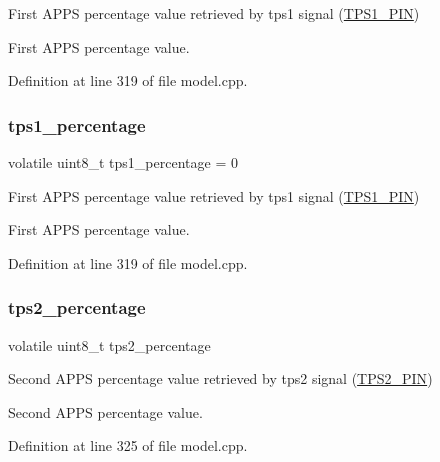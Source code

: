 First A\+P\+PS percentage value retrieved by tps1 signal (\mbox{\hyperlink{group___board__pinout__group_gae9aa914854f611488701c96a330b0bd4}{T\+P\+S1\+\_\+\+P\+IN}}) 

First A\+P\+PS percentage value. 

Definition at line 319 of file model.\+cpp.

\mbox{\label{group___board__model__group_ga1d42f28ccf027a3243fad064fa47ef81}} 
\subsubsection{\texorpdfstring{tps1\+\_\+percentage}{tps1\_percentage}\hspace{0.1cm}{\footnotesize\ttfamily [2/2]}}
{\footnotesize\ttfamily volatile uint8\+\_\+t tps1\+\_\+percentage = 0}



First A\+P\+PS percentage value retrieved by tps1 signal (\mbox{\hyperlink{group___board__pinout__group_gae9aa914854f611488701c96a330b0bd4}{T\+P\+S1\+\_\+\+P\+IN}}) 

First A\+P\+PS percentage value. 

Definition at line 319 of file model.\+cpp.

\mbox{\label{group___board__model__group_gaf69d82f83885abc5adbd5fcbf4c421cf}} 
\subsubsection{\texorpdfstring{tps2\+\_\+percentage}{tps2\_percentage}\hspace{0.1cm}{\footnotesize\ttfamily [1/2]}}
{\footnotesize\ttfamily volatile uint8\+\_\+t tps2\+\_\+percentage}



Second A\+P\+PS percentage value retrieved by tps2 signal (\mbox{\hyperlink{group___board__pinout__group_gab13a816bae3ca994897fc6f1cb590a67}{T\+P\+S2\+\_\+\+P\+IN}}) 

Second A\+P\+PS percentage value. 

Definition at line 325 of file model.\+cpp.

